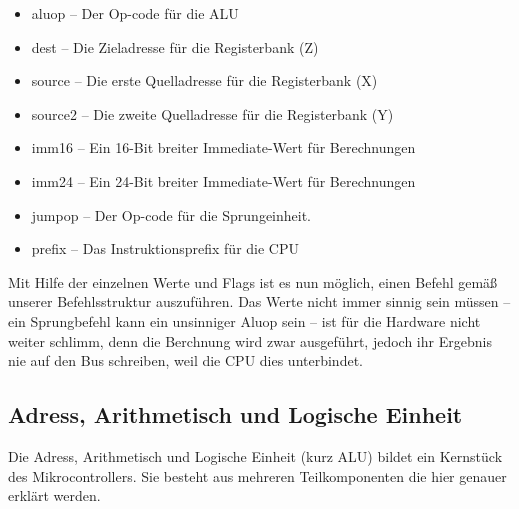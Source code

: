 \begin{itemize}
  \item aluop -- Der Op-code für die ALU
  \item dest --  Die Zieladresse für die Registerbank (Z)
  \item source -- Die erste Quelladresse für die Registerbank (X)
  \item source2 -- Die zweite Quelladresse für die Registerbank (Y)
  \item imm16 -- Ein 16-Bit breiter Immediate-Wert für Berechnungen
  \item imm24 -- Ein 24-Bit breiter Immediate-Wert für Berechnungen
  \item jumpop -- Der Op-code für die Sprungeinheit.
  \item prefix -- Das Instruktionsprefix für die CPU
\end{itemize}
Mit Hilfe der einzelnen Werte und Flags ist es nun möglich, einen Befehl gemäß unserer Befehlsstruktur auszuführen. Das Werte nicht immer sinnig sein müssen -- ein Sprungbefehl kann ein unsinniger Aluop sein -- ist für die Hardware nicht weiter schlimm, denn die Berchnung wird zwar ausgeführt, jedoch ihr Ergebnis nie auf den Bus schreiben, weil die CPU dies unterbindet.
\subsection{Adress, Arithmetisch und Logische Einheit}
Die Adress, Arithmetisch und Logische Einheit (kurz ALU) bildet ein Kernstück des Mikrocontrollers. Sie besteht aus mehreren Teilkomponenten die hier genauer erklärt werden.

